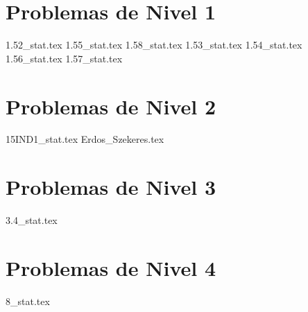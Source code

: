 \section{Problemas de Nivel 1}
{1.52_stat.tex} %
{1.55_stat.tex} %
{1.58_stat.tex} %
{1.53_stat.tex} %
{1.54_stat.tex} %
{1.56_stat.tex} %
{1.57_stat.tex} %
\section{Problemas de Nivel 2}
{15IND1_stat.tex} %
{Erdos_Szekeres.tex} %

\section{Problemas de Nivel 3}
{3.4_stat.tex} %

\section{Problemas de Nivel 4}
{8_stat.tex} %